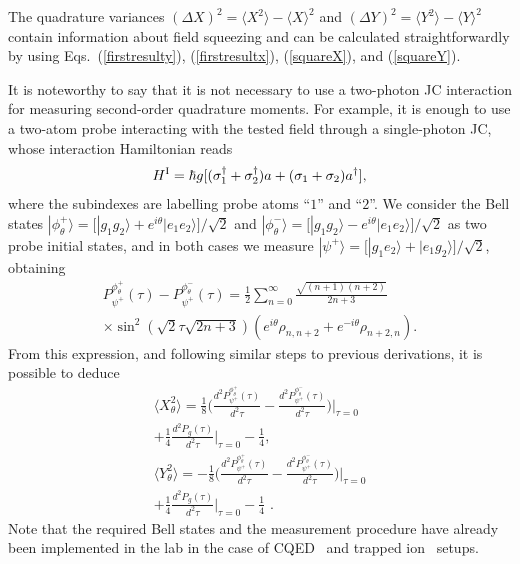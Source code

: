 \documentclass[pra,aps,twocolumn,showpacs]{revtex4}
\begin{document}
The quadrature variances $(\Delta X)^{2}= \langle X^{2} \rangle -
\langle X \rangle^{2}$ and $(\Delta Y)^{2}= \langle Y^{2} \rangle
- \langle Y \rangle^{2}$ contain information about field squeezing
and can be calculated straightforwardly by using
Eqs.~(\ref{firstresulty}), (\ref{firstresultx}), (\ref{squareX}),
and (\ref{squareY}).

It is noteworthy to say that it is not necessary to use a
two-photon JC interaction for measuring second-order quadrature
moments. For example, it is enough to use a two-atom probe
interacting with the tested field through a single-photon JC,
whose interaction Hamiltonian reads
\begin{eqnarray}
\label{twoatomjc} H^{\rm I} = \hbar g \lbrack ( \sigma^{\dagger}_1
+ \sigma^{\dagger}_2 )  a + ( \sigma_1 + \sigma_2 ) a^{\dagger}
\rbrack ,
\end{eqnarray}
where the subindexes are labelling probe atoms ``$1$'' and
``$2$''. We consider the Bell states $| \phi^{+}_{\theta} \rangle
= \lbrack | g_1 g_2 \rangle + e^{i \theta} | e_1 e_2 \rangle
\rbrack / \sqrt{2}$ and $| \phi^{-}_{\theta} \rangle = \lbrack |
g_1 g_2 \rangle - e^{i \theta} | e_1 e_2 \rangle \rbrack /
\sqrt{2}$ as two probe initial states, and in both cases we
measure $| \psi^{+} \rangle = \lbrack | g_1 e_2 \rangle + | e_1
g_2 \rangle \rbrack / \sqrt{2}$, obtaining
\begin{eqnarray}
\label{twoatomhomodyning} P^{\phi^{+}_{\theta} }_{ \psi^{+} }
(\tau) - P^{ \phi^{-}_{\theta} }_{ \psi^{+} } (\tau) =
\frac{1}{2} \sum^{\infty}_{n=0} \frac{\sqrt{(n+1)(n+2)}}{2n+3}
\nonumber \\
\times \sin^{2}(\sqrt{2} \tau \sqrt{2n + 3}) (e^{i\theta}\rho_{n ,
n+2} + e^{-i\theta} \rho_{n+2 , n}) .
\end{eqnarray}
From this expression, and following similar steps to previous
derivations, it is possible to deduce
\begin{eqnarray}\label{twoatomsquarex}
\langle X^{2}_{\theta} \rangle = \frac{1}{8} \bigg(
\frac{d^{2}P^{\phi^{+}_{\theta} }_{ \psi^{+} } (\tau)}{d^{2}\tau}
- \frac{d^{2}P^{\phi^{-}_{\theta} }_{ \psi^{+} }
(\tau)}{d^{2}\tau} \bigg) \Big|_{\tau=0} \nonumber \\
+ \frac{1}{4} \frac{d^{2}P_{g}(\tau)}{d^{2}\tau} \Big|_{\tau=0} -
\frac{1}{4} , \\ \label{twoatomsquarey} \langle Y^{2}_{\theta}
\rangle = - \frac{1}{8} \bigg( \frac{d^{2}P^{\phi^{+}_{\theta} }_{
\psi^{+} } (\tau)}{d^{2}\tau} - \frac{d^{2}P^{\phi^{-}_{\theta}
}_{ \psi^{+} }
(\tau)}{d^{2}\tau} \bigg) \Big|_{\tau=0} \nonumber \\
+ \frac{1}{4} \frac{d^{2}P_{g}(\tau)}{d^{2}\tau} \Big|_{\tau=0} -
\frac{1}{4} \, \, .
\end{eqnarray}
Note that the required Bell states and the measurement procedure
have already been implemented in the lab in the case of
CQED~\cite{HarocheZheng} and trapped ion~\cite{WinelandMolmer}
setups.
\end{document}
